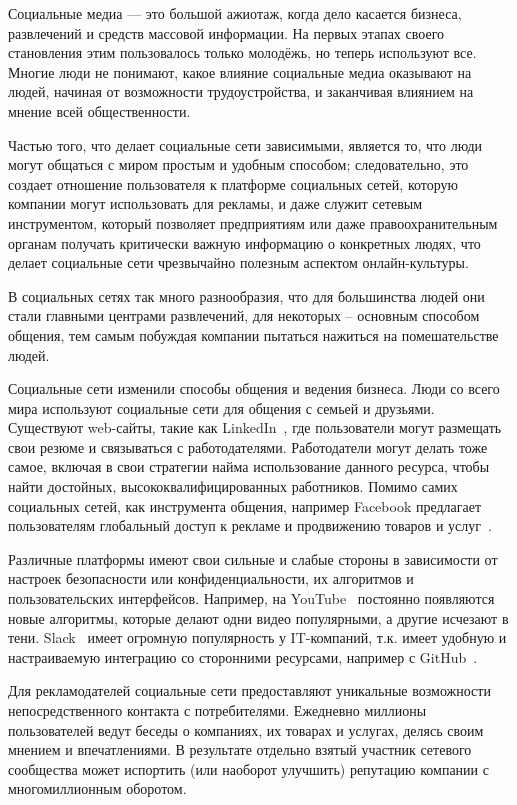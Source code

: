 Социальные медиа — это большой ажиотаж, когда дело касается
бизнеса, развлечений и средств массовой информации. На первых этапах
своего становления этим пользовалось только молодёжь, но теперь
используют все. Многие люди не понимают, какое влияние социальные
медиа оказывают на людей, начиная от возможности трудоустройства, и
заканчивая влиянием на мнение всей общественности.

Частью того, что делает социальные сети зависимыми, является то, что
люди могут общаться с миром простым и удобным способом; следовательно,
это создает отношение пользователя к платформе социальных сетей, которую
компании могут использовать для рекламы, и даже служит сетевым
инструментом, который позволяет предприятиям или даже
правоохранительным органам получать критически важную информацию о
конкретных людях, что делает социальные сети чрезвычайно полезным
аспектом онлайн-культуры.

В социальных сетях так много разнообразия, что для большинства
людей они стали главными центрами развлечений, для некоторых –
основным способом общения, тем самым побуждая компании пытаться
нажиться на помешательстве людей.

Социальные сети изменили способы общения и ведения бизнеса. Люди
со всего мира используют социальные сети для общения с семьей и
друзьями. Существуют web-сайты, такие как LinkedIn~\cite{linkedIn}, где пользователи
могут размещать свои резюме и связываться с работодателями. Работодатели
могут делать тоже самое, включая в свои стратегии найма использование
данного ресурса, чтобы найти достойных, высококвалифицированных
работников. Помимо самих социальных сетей, как инструмента общения,
например Facebook предлагает пользователям глобальный доступ к рекламе и
продвижению товаров и услуг~\cite{facebook}.

Различные платформы имеют свои сильные и слабые стороны в
зависимости от настроек безопасности или конфиденциальности, их
алгоритмов и пользовательских интерфейсов. Например, на YouTube~\cite{youtube}
постоянно появляются новые алгоритмы, которые делают одни видео
популярными, а другие исчезают в тени. Slack~\cite{slack} имеет огромную
популярность у IT-компаний, т.к. имеет удобную и настраиваемую
интеграцию со сторонними ресурсами, например с GitHub~\cite{gitHub}.

Для рекламодателей социальные сети предоставляют уникальные
возможности непосредственного контакта с потребителями. Ежедневно
миллионы пользователей ведут беседы о компаниях, их товарах и услугах,
делясь своим мнением и впечатлениями. В результате отдельно взятый
участник сетевого сообщества может испортить (или наоборот улучшить)
репутацию компании с многомиллионным оборотом.

